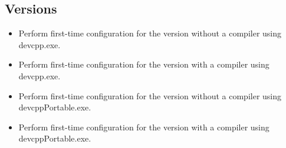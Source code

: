 \subsection{Versions}
\begin{itemize}
    \item Perform first-time configuration for the version without a compiler using devcpp.exe.
    \item Perform first-time configuration for the version with a compiler using devcpp.exe.
    \item Perform first-time configuration for the version without a compiler using devcppPortable.exe.
    \item Perform first-time configuration for the version with a compiler using devcppPortable.exe.
\end{itemize}